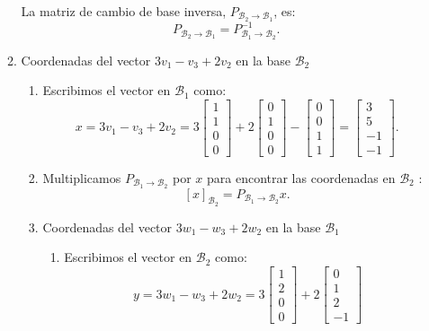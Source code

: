 \begin{enumerate}[label=\color{red}\textbf{\arabic*)}]
\begin{enumerate}[label=Paso \arabic*:]
        La matriz de cambio de base inversa, $P_{\mathcal{B}_2\to \mathcal{B}_1}$, es: \[
        P_{\mathcal{B}_2\to \mathcal{B}_1}=P_{\mathcal{B}_1\to \mathcal{B}_2}^{-1}.
        \] 
    \item Coordenadas del vector $3v_1-v_3+2v_2$ en la base $\mathcal{B}_2$ 
        \begin{enumerate}[label=\arabic*)]
            \item Escribimos el vector en $\mathcal{B}_1$ como: \[
            x=3v_1-v_3+2v_2=3\begin{bmatrix} 
            1\\ 1\\ 0\\ 0 
            \end{bmatrix}+2\begin{bmatrix} 
            0\\1\\0\\0 
            \end{bmatrix}  -\begin{bmatrix} 
            0\\0\\1\\1 
            \end{bmatrix}=\begin{bmatrix} 
            3\\5\\-1\\-1 
            \end{bmatrix}.  
            \] 
        \item Multiplicamos $P_{\mathcal{B}_1\to \mathcal{B}_2}$ por $x$ para encontrar las coordenadas en  $\mathcal{B}_2$ : \[
                [x]_{\mathcal{B}_2}=P_{\mathcal{B}_1\to \mathcal{B}_2}x.
        \] 
    \item Coordenadas del vector $3w_1-w_3+2w_2$ en la base $\mathcal{B}_1$ 
        \begin{enumerate}[label=\arabic*)]
            \item Escribimos el vector en $\mathcal{B}_2$ como: \[
            y=3w_1-w_3+2w_2=3\begin{bmatrix} 
            1\\2\\0\\0 
            \end{bmatrix} +2\begin{bmatrix} 
            0\\1\\2\\-1 

\end{bmatrix}\]
\end{enumerate}
\end{enumerate}
\end{enumerate}
\end{enumerate}
